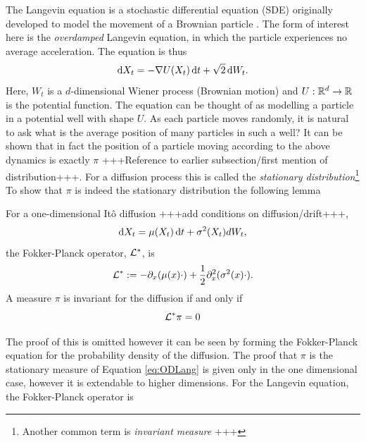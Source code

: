 The Langevin equation is a stochastic differential equation (SDE) originally developed to model the movement of a Brownian particle 	\cite{Langevin1908}. The form of interest here is the \emph{overdamped} Langevin equation, in which the particle experiences no average acceleration. The equation is thus
	\begin{equation} \mathop{}\!\mathrm{d} X_t = -\nabla U(X_t)\mathop{}\!\mathrm{d} t +\sqrt{2}\mathop{}\!\mathrm{d} W_t. \label{eq:ODLang}\end{equation}
Here, \(W_t\) is a \(d\)-dimensional Wiener process (Brownian motion) and \(U:\mathbb{R}^d \to \mathbb{R}\) is the potential function. The equation can be thought of as modelling a particle in a potential well with shape \(U\). As each particle moves randomly, it is natural to ask what is the average position of many particles in such a well? It can be shown that in fact the position of a particle moving according to the above dynamics is exactly \(\pi\) +++Reference to earlier subsection/first mention of distribution+++. For a diffusion process this is called the \emph{stationary distribution}\footnote{Another common term is \emph{invariant measure} +++} To show that \(\pi\) is indeed the stationary distribution the following lemma

\begin{lemma}
	For a one-dimensional It\^o diffusion +++add conditions on diffusion/drift+++,
	\[\mathop{}\!\mathrm{d} X_t = \mu(X_t)\mathop{}\!\mathrm{d} t + \sigma^2(X_t)dW_t,\]
	the Fokker-Planck operator, \(\mathcal{L}^*\), is
	\[\mathcal{L}^*:= -\partial_x(\mu(x)\cdot)+\frac{1}{2}\partial^2_x(\sigma^2(x)\cdot).\]
	A measure \(\pi\) is invariant for the diffusion if and only if
	\[\mathcal{L}^*\pi = 0\]
\end{lemma}
The proof of this is omitted however it can be seen by forming the Fokker-Planck equation for the probability density of the diffusion. The proof that \(\pi\) is the stationary measure of Equation \eqref{eq:ODLang} is given only in the one dimensional case, however it is extendable to higher dimensions. For the Langevin equation, the Fokker-Planck operator is

